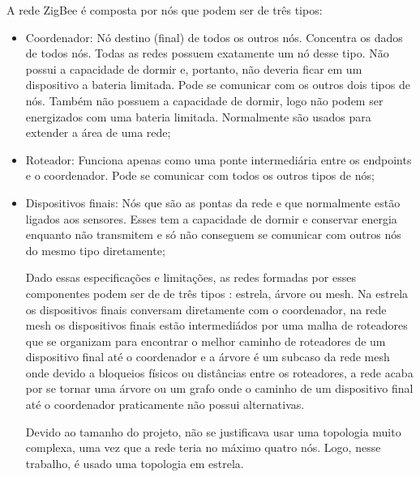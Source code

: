  A rede ZigBee é composta por nós que podem ser de três tipos:
 \begin{itemize}
\item{Coordenador}: Nó destino (final) de todos os outros nós. Concentra os dados de todos nós. Todas as redes possuem exatamente um nó desse tipo. Não possui a capacidade de dormir e, portanto, não deveria ficar em um dispositivo a bateria limitada. Pode se comunicar com os outros dois tipos de nós. Também não possuem a capacidade de dormir, logo não podem ser energizados com uma bateria limitada. Normalmente são usados para extender a área de uma rede;
\item{Roteador}: Funciona apenas como uma ponte intermediária entre os endpoints e o coordenador. Pode se comunicar com todos os outros tipos de nós;
\item{Dispositivos finais}: Nós que são as pontas da rede e que normalmente estão ligados aos sensores. Esses tem a capacidade de dormir e conservar energia enquanto não transmitem e só não conseguem se comunicar com outros nós do mesmo tipo diretamente;

Dado essas especificações e limitações, as redes formadas por esses componentes podem ser de de três tipos \cite{xbee_book}: estrela, árvore ou mesh. Na estrela os dispositivos finais conversam diretamente com o coordenador, na rede mesh os dispositivos finais estão intermediádos por uma malha de roteadores que se organizam para encontrar o melhor caminho de roteadores de um dispositivo final até o coordenador e a árvore é um subcaso da rede mesh onde devido a bloqueios físicos ou distâncias entre os roteadores, a rede acaba por se tornar uma árvore ou um grafo onde o caminho de um dispositivo final até o coordenador praticamente não possui alternativas.

Devido ao tamanho do projeto, não se justificava usar uma topologia muito complexa, uma vez que a rede teria no máximo quatro nós. Logo, nesse trabalho, é usado uma topologia em estrela.
\end{itemize}
